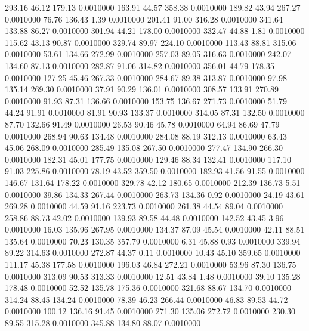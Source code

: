  293.16   46.12  179.13   0.0010000
 163.91   44.57  358.38   0.0010000
 189.82   43.94  267.27   0.0010000
  76.76  136.43    1.39   0.0010000
 201.41   91.00  316.28   0.0010000
 341.64  133.88   86.27   0.0010000
 301.94   44.21  178.00   0.0010000
 332.47   44.88    1.81   0.0010000
 115.62   43.13   90.87   0.0010000
 329.74   89.97  224.10   0.0010000
 113.43   88.81  315.06   0.0010000
  53.61  134.66  272.99   0.0010000
 257.03   89.05  316.63   0.0010000
 242.07  134.60   87.13   0.0010000
 282.87   91.06  314.82   0.0010000
 356.01   44.79  178.35   0.0010000
 127.25   45.46  267.33   0.0010000
 284.67   89.38  313.87   0.0010000
  97.98  135.14  269.30   0.0010000
  37.91   90.29  136.01   0.0010000
 308.57  133.91  270.89   0.0010000
  91.93   87.31  136.66   0.0010000
 153.75  136.67  271.73   0.0010000
  51.79   44.24   91.91   0.0010000
  81.91   90.93  133.37   0.0010000
 314.05   87.31  132.50   0.0010000
  87.70  132.66   91.49   0.0010000
  26.53   90.46   45.78   0.0010000
  64.94   86.69   47.79   0.0010000
 268.94   90.63  134.48   0.0010000
 284.08   88.19  312.13   0.0010000
  63.43   45.06  268.09   0.0010000
 285.49  135.08  267.50   0.0010000
 277.47  134.90  266.30   0.0010000
 182.31   45.01  177.75   0.0010000
 129.46   88.34  132.41   0.0010000
 117.10   91.03  225.86   0.0010000
  78.19   43.52  359.50   0.0010000
 182.93   41.56   91.55   0.0010000
 146.67  131.64  178.22   0.0010000
 329.78   42.12  180.65   0.0010000
 212.39  136.73    5.51   0.0010000
  39.86  134.33  267.44   0.0010000
 263.73  134.36    0.92   0.0010000
  24.19   43.61  269.28   0.0010000
  44.59   91.16  223.73   0.0010000
 261.38   44.54   89.04   0.0010000
 258.86   88.73   42.02   0.0010000
 139.93   89.58   44.48   0.0010000
 142.52   43.45    3.96   0.0010000
  16.03  135.96  267.95   0.0010000
 134.37   87.09   45.54   0.0010000
  42.11   88.51  135.64   0.0010000
  70.23  130.35  357.79   0.0010000
   6.31   45.88    0.93   0.0010000
 339.94   89.22  314.63   0.0010000
 272.87   44.37    0.11   0.0010000
  10.43   45.10  359.65   0.0010000
 111.17   45.38  177.58   0.0010000
 196.03   46.84  272.21   0.0010000
  53.96   87.30  136.75   0.0010000
 313.09   90.53  313.33   0.0010000
  12.51   43.84    1.48   0.0010000
  39.10  135.28  178.48   0.0010000
  52.52  135.78  175.36   0.0010000
 321.68   88.67  134.70   0.0010000
 314.24   88.45  134.24   0.0010000
  78.39   46.23  266.44   0.0010000
  46.83   89.53   44.72   0.0010000
 100.12  136.16   91.45   0.0010000
 271.30  135.06  272.72   0.0010000
 230.30   89.55  315.28   0.0010000
 345.88  134.80   88.07   0.0010000
